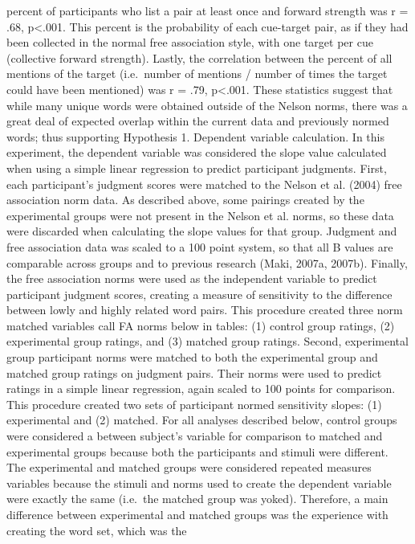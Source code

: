 \documentclass[english,man]{apa6}
\theoremstyle{definition}
\theoremstyle{definition}
\theoremstyle{definition}
\theoremstyle{remark}
\begin{document}
percent of participants who list a pair at least once and forward
strength was r = .68, p\textless{}.001. This percent is the probability
of each cue-target pair, as if they had been collected in the normal
free association style, with one target per cue (collective forward
strength). Lastly, the correlation between the percent of all mentions
of the target (i.e.~number of mentions / number of times the target
could have been mentioned) was r = .79, p\textless{}.001. These
statistics suggest that while many unique words were obtained outside of
the Nelson norms, there was a great deal of expected overlap within the
current data and previously normed words; thus supporting Hypothesis 1.
Dependent variable calculation. In this experiment, the dependent
variable was considered the slope value calculated when using a simple
linear regression to predict participant judgments. First, each
participant's judgment scores were matched to the Nelson et al. (2004)
free association norm data. As described above, some pairings created by
the experimental groups were not present in the Nelson et al. norms, so
these data were discarded when calculating the slope values for that
group. Judgment and free association data was scaled to a 100 point
system, so that all B values are comparable across groups and to
previous research (Maki, 2007a, 2007b). Finally, the free association
norms were used as the independent variable to predict participant
judgment scores, creating a measure of sensitivity to the difference
between lowly and highly related word pairs. This procedure created
three norm matched variables call FA norms below in tables: (1) control
group ratings, (2) experimental group ratings, and (3) matched group
ratings. Second, experimental group participant norms were matched to
both the experimental group and matched group ratings on judgment pairs.
Their norms were used to predict ratings in a simple linear regression,
again scaled to 100 points for comparison. This procedure created two
sets of participant normed sensitivity slopes: (1) experimental and (2)
matched. For all analyses described below, control groups were
considered a between subject's variable for comparison to matched and
experimental groups because both the participants and stimuli were
different. The experimental and matched groups were considered repeated
measures variables because the stimuli and norms used to create the
dependent variable were exactly the same (i.e.~the matched group was
yoked). Therefore, a main difference between experimental and matched
groups was the experience with creating the word set, which was the
\end{document}
